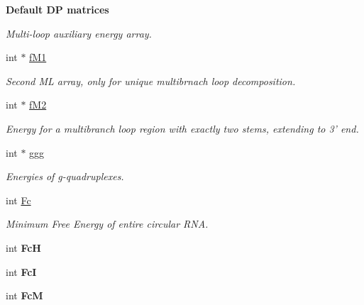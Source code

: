 \begin{Indent}{\bf Default D\-P matrices}
\begin{DoxyCompactItemize}
\begin{DoxyCompactList}\small\item\em Multi-\/loop auxiliary energy array. \end{DoxyCompactList}\item 
\hypertarget{group__dp__matrices_ae4e598d601f5ece6b8b4ffffcae2db06}{int $\ast$ \hyperlink{group__dp__matrices_ae4e598d601f5ece6b8b4ffffcae2db06}{f\-M1}}\label{group__dp__matrices_ae4e598d601f5ece6b8b4ffffcae2db06}

\begin{DoxyCompactList}\small\item\em Second M\-L array, only for unique multibrnach loop decomposition. \end{DoxyCompactList}\item 
\hypertarget{group__dp__matrices_ad29106e37d485b3f20b7be468e6c179c}{int $\ast$ \hyperlink{group__dp__matrices_ad29106e37d485b3f20b7be468e6c179c}{f\-M2}}\label{group__dp__matrices_ad29106e37d485b3f20b7be468e6c179c}

\begin{DoxyCompactList}\small\item\em Energy for a multibranch loop region with exactly two stems, extending to 3' end. \end{DoxyCompactList}\item 
\hypertarget{group__dp__matrices_a0b7b86a5c75c96eabb89eb53a13e7164}{int $\ast$ \hyperlink{group__dp__matrices_a0b7b86a5c75c96eabb89eb53a13e7164}{ggg}}\label{group__dp__matrices_a0b7b86a5c75c96eabb89eb53a13e7164}

\begin{DoxyCompactList}\small\item\em Energies of g-\/quadruplexes. \end{DoxyCompactList}\item 
\hypertarget{group__dp__matrices_ac6a22d71c6a0eccedf978372b19b458a}{int \hyperlink{group__dp__matrices_ac6a22d71c6a0eccedf978372b19b458a}{Fc}}\label{group__dp__matrices_ac6a22d71c6a0eccedf978372b19b458a}

\begin{DoxyCompactList}\small\item\em Minimum Free Energy of entire circular R\-N\-A. \end{DoxyCompactList}\item 
\hypertarget{group__dp__matrices_a1ba03c53ee2a32eaf8b46c0eb259e0c4}{int {\bfseries Fc\-H}}\label{group__dp__matrices_a1ba03c53ee2a32eaf8b46c0eb259e0c4}

\item 
\hypertarget{group__dp__matrices_a96ac173770c9745a30823fa17fe0b7f4}{int {\bfseries Fc\-I}}\label{group__dp__matrices_a96ac173770c9745a30823fa17fe0b7f4}

\item 
\hypertarget{group__dp__matrices_a9a4bf70926f79372388eccc7e73759e9}{int {\bfseries Fc\-M}}\label{group__dp__matrices_a9a4bf70926f79372388eccc7e73759e9}

\end{DoxyCompactItemize}
\end{Indent}
